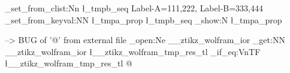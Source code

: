 \documentclass{article}
\begin{document}
\ExplSyntaxOn


\seq_set_from_clist:Nn \l_tmpb_seq { {Label-A=111,222}, {Label-B=333,444} }
\prop_set_from_keyval:NN \l_tmpa_prop \l_tmpb_seq
\prop_show:N \l_tmpa_prop
\ExplSyntaxOff

--> BUG of '@' from external file
\ior_open:Ne \g__ztikz_wolfram_ior {\wolframOuputFile}
\ior_get:NN  \g__ztikz_wolfram_ior \l__ztikz_wolfram_tmp_res_tl
\makeatletter
\tl_if_eq:VnTF \l__ztikz_wolfram_tmp_res_tl {@~}
  {}
  {}
\end{document}
